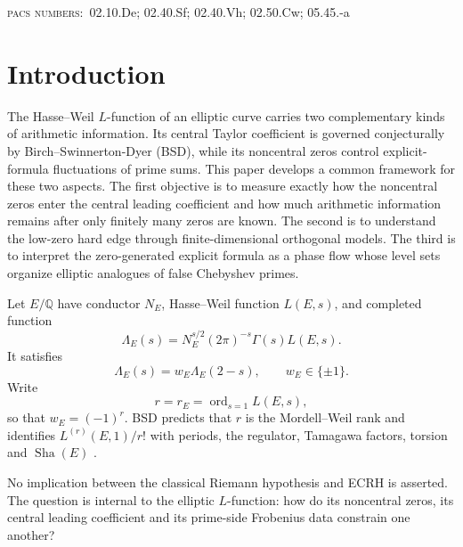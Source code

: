 \documentclass[11pt,reqno]{amsart}
\theoremstyle{remark}
\newcommand{\Q}{\mathbb{Q}}
\newcommand{\ShaE}{\mathop{\mathrm{Sha}}}
\newcommand{\ord}{\operatorname{ord}}
\newcommand{\pacsline}[1]{%
  \begingroup
  \par\vspace{-0.6em}
  \begin{center}\small\textsc{pacs numbers:}\ #1\end{center}
  \par\vspace{0.2em}
  \endgroup}
\begin{document}
\pacsline{02.10.De; 02.40.Sf; 02.40.Vh; 02.50.Cw; 05.45.-a}


\section{Introduction}
\label{sec:introduction}

The Hasse--Weil $L$-function of an elliptic curve carries two complementary kinds of arithmetic information.  Its central Taylor coefficient is governed conjecturally by Birch--Swinnerton-Dyer (BSD), while its noncentral zeros control explicit-formula fluctuations of prime sums.  This paper develops a common framework for these two aspects.  The first objective is to measure exactly how the noncentral zeros enter the central leading coefficient and how much arithmetic information remains after only finitely many zeros are known.  The second is to understand the low-zero hard edge through finite-dimensional orthogonal models.  The third is to interpret the zero-generated explicit formula as a phase flow whose level sets organize elliptic analogues of false Chebyshev primes.

Let $E/\Q$ have conductor $N_E$, Hasse--Weil function $L(E,s)$, and completed function
\begin{equation}
  \Lambda_E(s)=N_E^{s/2}(2\pi)^{-s}\Gamma(s)L(E,s).
  \label{eq:completed}
\end{equation}
It satisfies
\begin{equation}
  \Lambda_E(s)=w_E\Lambda_E(2-s),
  \qquad w_E\in\{\pm1\}.
  \label{eq:functional-equation}
\end{equation}
Write
\begin{equation}
  r=r_E=\ord_{s=1}L(E,s),
\end{equation}
so that $w_E=(-1)^r$.  BSD predicts that $r$ is the Mordell--Weil rank and identifies $L^{(r)}(E,1)/r!$ with periods, the regulator, Tamagawa factors, torsion and $\ShaE(E)$ \cite{BSD1965,Cassels1965}.

No implication between the classical Riemann hypothesis and ECRH is asserted.  The question is internal to the elliptic $L$-function: how do its noncentral zeros, its central leading coefficient and its prime-side Frobenius data constrain one another?
\end{document}
